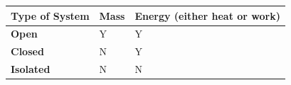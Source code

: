 \documentclass[
  9pt,
]{extbook}
\newcounter{none} %
\theoremstyle{definition}
\theoremstyle{definition}
\theoremstyle{definition}
\theoremstyle{definition}
\theoremstyle{remark}
\begin{document}
{\def\LTcaptype{none} %
\begin{longtable}[]{@{}
  >{\raggedright\arraybackslash}p{}
  >{\centering\arraybackslash}p{}
  >{\centering\arraybackslash}p{}@{}}
\toprule\noalign{}
\begin{minipage}[b]{\linewidth}\raggedright
\textbf{Type of System}
\end{minipage} & \begin{minipage}[b]{\linewidth}\centering
\textbf{Mass}
\end{minipage} & \begin{minipage}[b]{\linewidth}\centering
\textbf{Energy} (either heat or work)
\end{minipage} \\
\midrule\noalign{}
\endhead
\bottomrule\noalign{}
\endlastfoot
\textbf{Open} & Y & Y \\
\textbf{Closed} & N & Y \\
\textbf{Isolated} & N & N \\
\end{longtable}
}
\end{document}
